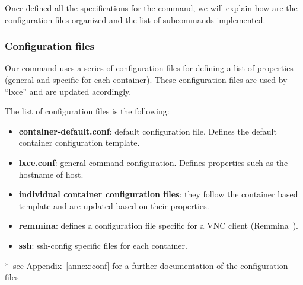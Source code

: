 Once defined all the specifications for the command, we will explain how are the configuration files organized and the list of subcommands implemented.


\subsubsection{Configuration files}
Our command uses a series of configuration files for defining a list of properties (general and specific for each container). These configuration files are used by ``lxce'' and are updated acordingly.

The list of configuration files is the following:
\begin{itemize}
	\item{\textbf{container-default.conf}: default configuration file. Defines the default container configuration template.}
	\item{\textbf{lxce.conf}: general command configuration. Defines properties such as the hostname of host.}
	\item{\textbf{individual container configuration files}: they follow the container based template and are updated based on their properties.}
	\item{\textbf{remmina}: defines a configuration file specific for a VNC client (Remmina~\cite{remmina}). }
	\item{\textbf{ssh}: ssh-config specific files for each container.}
\end{itemize}

*~see Appendix~\ref{annex:conf} for a further documentation of the configuration files

